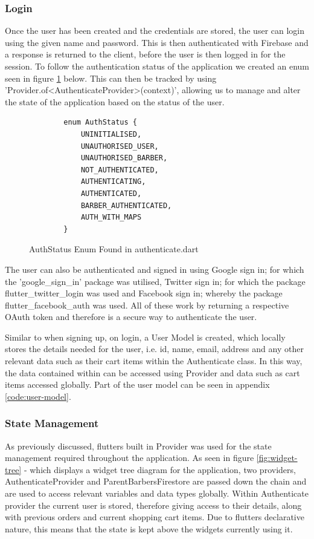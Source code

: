 \documentclass[12pt]{article}
\begin{document}
	
	\subsubsection{Login}
	Once the user has been created and the credentials are stored, the user can login using the given name and password. This is then authenticated with Firebase and a response is returned to the client, before the user is then logged in for the session. To follow the authentication status of the application we created an enum seen in figure \ref{fig:authenticate-enum} below. This can then be tracked by using 'Provider.of<AuthenticateProvider>(context)', allowing us to manage and alter the state of the application based on the status of the user.
	
	\begin{figure}[H]
	\centering
	\label{fig:authenticate-enum}
	\begin{verbatim}
		enum AuthStatus {
			UNINITIALISED,
			UNAUTHORISED_USER,
			UNAUTHORISED_BARBER,
			NOT_AUTHENTICATED,
			AUTHENTICATING,
			AUTHENTICATED,
			BARBER_AUTHENTICATED,
			AUTH_WITH_MAPS
		}
	\end{verbatim}
	\caption{AuthStatus Enum Found in authenticate.dart}
	\end{figure}
	
	The user can also be authenticated and signed in using Google sign in; for which the 'google\_sign\_in' package was utilised, Twitter sign in; for which the package flutter\_twitter\_login was used and Facebook sign in; whereby the package flutter\_facebook\_auth was used. All of these work by returning a respective OAuth token and therefore is a secure way to authenticate the user.
	
	
	Similar to when signing up, on login, a User Model is created, which locally stores the details needed for the user, i.e. id, name, email, address and any other relevant data such as their cart items within the Authenticate class. In this way, the data contained within can be accessed using Provider and data such as cart items accessed globally. Part of the user model can be seen in appendix \ref{code:user-model}.
	
	
	\subsubsection{State Management}
	
	As previously discussed, flutters built in Provider was used for the state management required throughout the application. As seen in figure \ref{fig:widget-tree} - which displays a widget tree diagram for the application, two providers, AuthenticateProvider and ParentBarbersFirestore are passed down the chain and are used to access relevant variables and data types globally. Within Authenticate provider the current user is stored, therefore giving access to their details, along with previous orders and current shopping cart items. Due to flutters declarative nature, this means that the state is kept above the widgets currently using it. 
	
\end{document}

